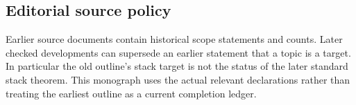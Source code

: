 \subsection*{Editorial source policy}
Earlier source documents contain historical scope statements and counts. Later checked developments can supersede an earlier statement that a topic is a target. In particular the old outline's stack target is not the status of the later standard stack theorem. This monograph uses the actual relevant declarations rather than treating the earliest outline as a current completion ledger.


